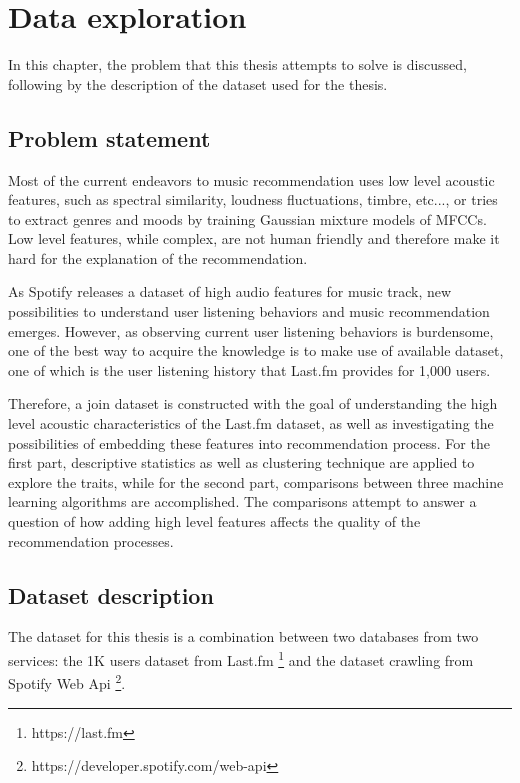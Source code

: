 \chapter{Data exploration} %

\label{Chapter3} %

In this chapter, the problem that this thesis attempts to solve is discussed, following by the description of the dataset used for the thesis.

\section{Problem statement}
Most of the current endeavors to music recommendation uses low level acoustic features, such as spectral similarity, loudness fluctuations, timbre, etc..., or tries to extract genres and moods by training Gaussian mixture models of MFCCs. Low level features, while complex, are not human friendly and therefore make it hard for the explanation of the recommendation. 

\noindent As Spotify releases a dataset of high audio features for music track, new possibilities to understand user listening behaviors and music recommendation emerges. However, as observing current user listening behaviors is burdensome, one of the best way to acquire the knowledge is to make use of available dataset, one of which is the user listening history that Last.fm provides for 1,000 users. 

\noindent Therefore, a join dataset is constructed with the goal of understanding the high level acoustic characteristics of the Last.fm dataset, as well as investigating the possibilities of embedding these features into recommendation process. For the first part, descriptive statistics as well as clustering technique are applied to explore the traits, while for the second part, comparisons between three machine learning algorithms are accomplished. The comparisons attempt to answer a question of how adding high level features affects the quality of the recommendation processes.

\section{Dataset description}

The dataset for this thesis is a combination between two databases from two services: the 1K users dataset from Last.fm \footnote{https://last.fm} and the dataset crawling from Spotify Web Api \footnote{https://developer.spotify.com/web-api}. 

